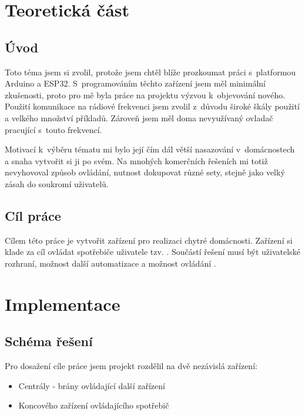 \documentclass[11pt,a4paper,twoside,openright]{report}
\begin{document}
	
	
	
	\setcounter{tocdepth}{2}
	\tableofcontents
	
	\chapter{Teoretická část}
	\pagestyle{fancy}
	
	\section{Úvod}
	
	Toto téma jsem si zvolil, protože jsem chtěl blíže prozkoumat práci s~platformou Arduino a ESP32. S~programováním těchto zařízení jsem měl minimální zkušenosti, proto pro mě byla práce na projektu výzvou k~objevování nového. Použití komunikace na rádiové frekvenci jsem zvolil z~důvodu široké škály použití a velkého množství příkladů. Zároveň jsem měl doma nevyužívaný ovladač pracující s~touto frekvencí.
	
	
	
	Motivací k~výběru tématu  mi bylo její čím dál větší nasazování v~domácnostech a snaha vytvořit si ji po svém. Na mnohých komerčních řešeních mi totiž nevyhovoval způsob ovládání, nutnost dokupovat různé sety, stejně jako velký zásah do soukromí uživatelů.
	
	
	\section{Cíl práce}
	
	Cílem této práce je vytvořit zařízení pro realizaci chytré domácnosti. Zařízení si klade za cíl ovládat spotřebiče uživatele tzv. . Součástí řešení musí být uživatelské rozhraní, možnost další automatizace a možnost ovládání .
	
	
	\chapter{Implementace}
	\section{Schéma řešení}
	
	Pro dosažení cíle práce jsem projekt rozdělil na dvě nezávislá zařízení:
	
	\begin{itemize}
		\item Centrály - brány ovládající další zařízení
		\item Koncového zařízení ovládajícího spotřebič
	\end{itemize}
	
\end{document}
